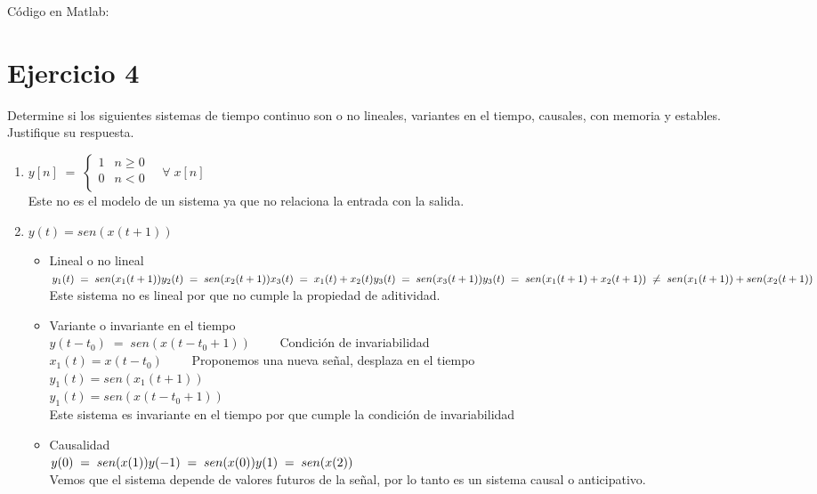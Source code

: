 \documentclass[10pt,a4paper]{report}
\begin{document}
\begin{enumerate}
Código en Matlab:
    
    
\end{enumerate}

\section{Ejercicio 4}
Determine si los siguientes sistemas de tiempo continuo son o no lineales, variantes en el tiempo, causales, con memoria y estables. Justifique su respuesta.
\begin{enumerate}
  \item  $ y\left[n\right]\;=\;\left\{\begin{array}{lc}
                                     1&n\geq0 \\
                                     0&n<0 \\ 
                                   \end{array}\right. \quad \forall\;x\left[n\right]
$\\
Este no es el modelo de un sistema ya que no relaciona la entrada con la salida.
  \item $y(t)=sen(x(t+1)) $
  \begin{itemize}
    \item Lineal o no lineal\\
$ y_1(t)\;=\;sen(x_1(t+1))\\
  y_2(t)\;=\;sen(x_2(t+1))\\
  x_3(t)\;=\;x_1(t)+x_2(t)\\
  y_3(t)\;=\;sen(x_3(t+1))\\
  y_3(t)\;=\;sen(x_1(t+1)+x_2(t+1))\;\neq\;sen(x_1(t+1))+sen(x_2(t+1))
$\\
  \newline Este sistema no es lineal por que no cumple la propiedad de aditividad.

  \item Variante o invariante en el tiempo\\
$ y(t-t_0)\;=\;sen(x(t-t_0+1)) \qquad $ Condición de invariabilidad\\
$ x_1(t)=x(t-t_0) \qquad $ Proponemos una nueva señal, desplaza en el tiempo \\ 
$ y_1(t)=sen(x_1(t+1)) $\\
$ y_1(t)=sen(x(t-t_0+1)) $\\
  \newline  
  Este sistema es invariante en el tiempo por que cumple la condición de invariabilidad\\
  \newline
  \item Causalidad\\
$y(0)\;=\;sen(x(1))\\
y(-1)\;=\;sen(x(0))\\
y(1)\;=\;sen(x(2))$\\
  \newline
Vemos que el sistema depende de valores futuros de la señal, por lo tanto es un sistema causal o anticipativo.\\


\end{itemize}
\end{enumerate}
\end{document}
